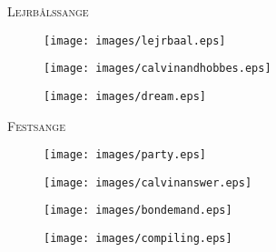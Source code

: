 \begin{center}
{\Huge\textsc{Lejrbålssange}}
\end{center}
\begin{figure}[h!]
  \centering
    \texttt{[image: images/lejrbaal.eps]}
\end{figure}
\newpage


\newpage

\newpage

\newpage


\newpage


\newpage

\begin{figure}[hb!]
  \centering
    \texttt{[image: images/calvinandhobbes.eps]}
\end{figure}
\newpage


\newpage

\newpage

\begin{figure}[h!]
  \centering
    \texttt{[image: images/dream.eps]}
\end{figure}
\newpage

\begin{center}
{\Huge\textsc{Festsange}}
\end{center}
\begin{figure}[h!]
  \centering
    \texttt{[image: images/party.eps]}
\end{figure}
\newpage

\begin{figure}[hb!]
  \centering
    \texttt{[image: images/calvinanswer.eps]}
\end{figure}
\newpage

\newpage

\begin{figure}[h!]
  \centering
    \texttt{[image: images/bondemand.eps]}
\end{figure}
\newpage

\newpage

\begin{figure}[hb!]
  \centering
    \texttt{[image: images/compiling.eps]}
\end{figure}
\newpage

\newpage


\newpage

\newpage

\newpage


\newpage

\newpage

